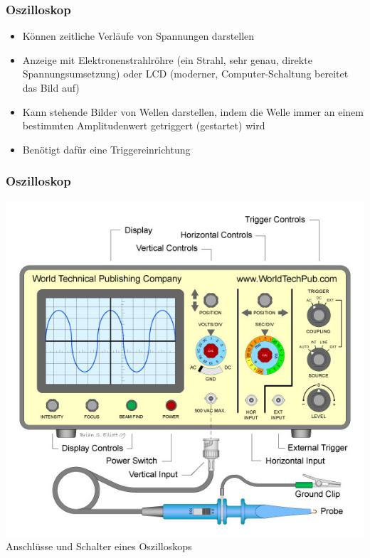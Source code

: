 \begin{frame}
  \frametitle{Oszilloskop}
  \begin{itemize}
    \item Können zeitliche Verläufe von Spannungen darstellen
    \item Anzeige mit Elektronenstrahlröhre (ein Strahl, sehr genau, direkte Spannungsumsetzung) oder LCD (moderner, Computer-Schaltung bereitet das Bild auf)
    \item Kann stehende Bilder von Wellen darstellen, indem die Welle immer an einem bestimmten Amplitudenwert getriggert (gestartet) wird
    \item Benötigt dafür eine Triggereinrichtung
  \end{itemize}
\end{frame}

\begin{frame}
  \frametitle{Oszilloskop}
  \begin{center}
    \includegraphics[width=.8\textwidth,height=.8\textheight,keepaspectratio]{e17/WTPCOscilloscopeBeschreiben.jpg}\\
    {\tiny Anschlüsse und Schalter eines Oszilloskops \href{refs}{\cite{wmen}}}
  \end{center}
\end{frame}

